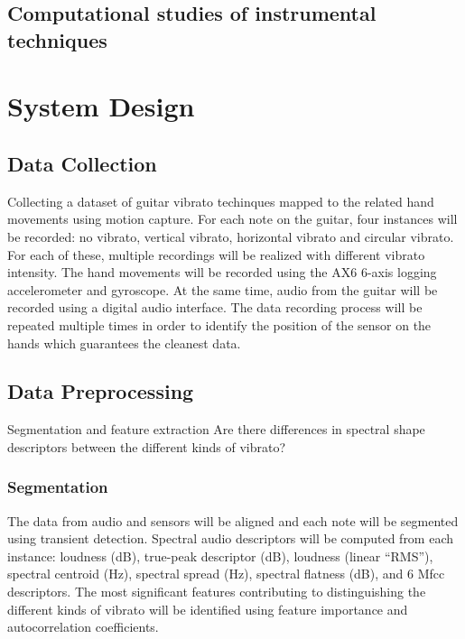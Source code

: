 \documentclass{nime-alternate} %
\begin{document}
\subsection{Computational studies of instrumental techniques}


\section{System Design}

\subsection{Data Collection}
Collecting a dataset of guitar vibrato techinques mapped to the related hand movements using motion capture. For each note on the guitar, four instances will be recorded: no vibrato, vertical vibrato, horizontal vibrato and circular vibrato. For each of these, multiple recordings will be realized with different vibrato intensity. The hand movements will be recorded using the AX6 6-axis logging accelerometer and gyroscope. At the same time, audio from the guitar will be recorded using a digital audio interface. The data recording process will be repeated multiple times in order to identify the position of the sensor on the hands which guarantees the cleanest data.

\subsection{Data Preprocessing}
Segmentation and feature extraction
Are there differences in spectral shape descriptors between the different kinds of vibrato?

\subsubsection{Segmentation}

The data from audio and sensors will be aligned and each note will be segmented using transient detection. Spectral audio descriptors will be computed from each instance: loudness (dB), true-peak descriptor (dB), loudness (linear “RMS”), spectral centroid (Hz), spectral spread (Hz), spectral flatness (dB), and 6 Mfcc descriptors. The most significant features contributing to distinguishing the different kinds of vibrato will be identified using feature importance and autocorrelation coefficients.
\end{document}
